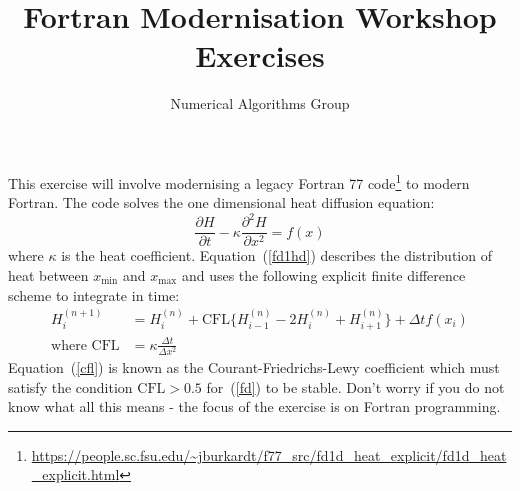 \documentclass[12pt]{article}
\begin{document}
 
 
 
\title{\bf Fortran Modernisation Workshop \\ Exercises}
\author{Numerical Algorithms Group}
 
\maketitle

This exercise will involve modernising a legacy Fortran 77 code\footnote{\url{https://people.sc.fsu.edu/~jburkardt/f77_src/fd1d_heat_explicit/fd1d_heat_explicit.html}} to modern Fortran. The code solves the one dimensional heat diffusion equation:
\begin{equation} \label{fd1hd}
\frac{\partial H}{\partial t} - \kappa\frac{\partial^{2} H}{\partial x^{2}} = f(x)
\end{equation}
where $\kappa$ is the heat coefficient. Equation~(\ref{fd1hd}) describes the distribution of heat 
between $x_{\text{min}}$ and $x_{\text{max}}$ and uses the following explicit finite difference 
scheme to integrate in time:
\begin{align}
H^{(n+1)}_{i} & = H^{(n)}_{i} + \text{CFL}\big\{H^{(n)}_{i-1}-2H^{(n)}_{i} +
                      H^{(n)}_{i+1}\big\} + \Delta t f(x_{i}) \label{fd} \\
            \text{where CFL} & = \kappa\frac{\Delta t}{\Delta x^{2}} \label{cfl}
\end{align}
Equation~(\ref{cfl}) is known as the Courant-Friedrichs-Lewy coefficient which must satisfy
the condition $\text{CFL} > 0.5$ for~(\ref{fd}) to be stable. Don't worry if you do 
not know what all this means - the focus of the exercise is on Fortran programming. \\
\end{document}
